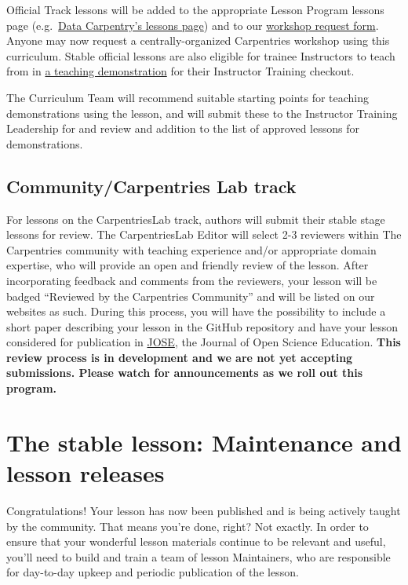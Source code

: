\documentclass[
]{book}
\begin{document}
Official Track lessons will be added to
the appropriate Lesson Program lessons page (e.g.~\href{https://datacarpentry.org/lessons/}{Data Carpentry's lessons page})
and to our \href{http://carpentries.org/request-workshop}{workshop request form}. Anyone may now request a centrally-organized
Carpentries workshop using this curriculum.
Stable official lessons are also eligible for trainee Instructors to teach from in
\href{https://carpentries.github.io/instructor-training/checkout/index.html\#3-teaching-demonstration}{a teaching demonstration} for their Instructor Training checkout.

The Curriculum Team will recommend suitable starting points for teaching demonstrations using the lesson,
and will submit these to the Instructor Training Leadership for and review and addition to the
list of approved lessons for demonstrations.

\hypertarget{communitycarpentries-lab-track}{%
\subsection{Community/Carpentries Lab track}\label{communitycarpentries-lab-track}}

For lessons on the CarpentriesLab track, authors will submit their stable stage lessons for review.
The CarpentriesLab Editor will select 2-3 reviewers within The Carpentries community with teaching experience
and/or appropriate domain expertise, who will provide an open and friendly review of the lesson.
After incorporating feedback and comments from the reviewers, your lesson will be badged
``Reviewed by the Carpentries Community'' and will be listed on our websites as such. During this process,
you will have the possibility to include a short paper describing your
lesson in the GitHub repository and have your lesson considered for publication in
\href{http://jose.theoj.org/}{JOSE}, the Journal of Open Science Education.
\textbf{This review process is in development and we are not yet accepting submissions. Please watch for
announcements as we roll out this program.}

\hypertarget{the-stable-lesson-maintenance-and-lesson-releases}{%
\section{The stable lesson: Maintenance and lesson releases}\label{the-stable-lesson-maintenance-and-lesson-releases}}

Congratulations! Your lesson has now been published and is being actively taught by the community.
That means you're done, right? Not exactly. In order to ensure that your wonderful lesson materials
continue to be relevant and useful, you'll need to build and train a team of lesson Maintainers, who
are responsible for day-to-day upkeep and periodic publication of the lesson.
\end{document}
